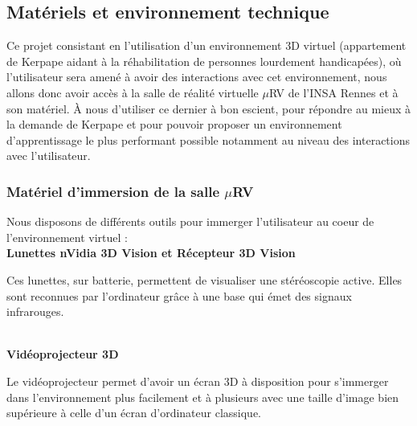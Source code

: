 \subsection{Matériels et environnement technique}

Ce projet consistant en l'utilisation d'un environnement 3D virtuel (appartement de Kerpape aidant à la réhabilitation de personnes lourdement handicapées), où l'utilisateur sera amené à avoir des interactions avec cet environnement, nous allons donc avoir accès à la salle de réalité virtuelle $\mu$RV de l'INSA Rennes et à son matériel. \`A nous d'utiliser ce dernier à bon escient, pour répondre au mieux à la demande de Kerpape et pour pouvoir proposer un environnement d'apprentissage le plus performant possible notamment au niveau des interactions avec l'utilisateur.

\subsubsection{Matériel d'immersion de la salle $\mu$RV}
Nous disposons de différents outils pour immerger l'utilisateur au coeur de l'environnement virtuel :
\\

\textbf{Lunettes nVidia 3D Vision et Récepteur 3D Vision}
\\
	\hfill
	\begin{minipage}{0.8\textwidth}
	Ces lunettes, sur batterie, permettent de visualiser une stéréoscopie active. Elles sont reconnues par l'ordinateur grâce à une base qui émet des signaux infrarouges.
	\end{minipage}
\\

\textbf{Vidéoprojecteur 3D}
\\
	\hfill
	\begin{minipage}{0.8\textwidth}
	Le vidéoprojecteur permet d'avoir un écran 3D à disposition pour s'immerger dans l'environnement plus facilement et à plusieurs avec une taille d'image bien supérieure à celle d'un écran d'ordinateur classique.
	\end{minipage}
\\


